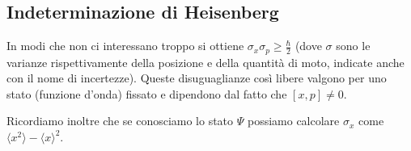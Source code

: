 \documentclass[10pt,a4paper]{article}
\begin{document}
\begin{multicols}{2}
  \subsection*{Indeterminazione di Heisenberg}
  In modi che non ci interessano troppo si ottiene $\sigma_x \sigma_p \ge \frac{\hbar}{2}$ (dove $\sigma$ sono le varianze rispettivamente della posizione e della quantità di moto, indicate anche con il nome di incertezze). Queste disuguaglianze così libere valgono per uno stato (funzione d'onda) fissato e dipendono dal fatto che $[x, p] \neq 0$.

  Ricordiamo inoltre che se conosciamo lo stato $\Psi$ possiamo calcolare $\sigma_x$ come $\langle x^2 \rangle - {\langle x \rangle}^2$.  
\end{multicols}
\end{document}
